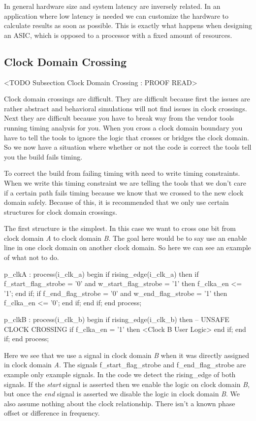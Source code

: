 In general hardware size and system latency are inversely related. In an application where low latency is needed we can customize the hardware to calculate results as soon as possible. This is exactly what happens when designing an \ac{ASIC}, which is opposed to a processor with a fixed amount of resources. 

\subsection{Clock Domain Crossing}
	<TODO Subsection Clock Domain Crossing : PROOF READ>
	
Clock domain crossings are difficult. They are difficult because first the issues are rather abstract and behavioral simulations will not find issues in clock crossings. Next they are difficult because you have to break way from the vendor tools running timing analysis for you. When you cross a clock domain boundary you have to tell the tools to ignore the logic that crosses or bridges the clock domain. So we now have a situation where whether or not the code is correct the tools tell you the build fails timing. 

To correct the build from failing timing with need to write timing constraints. When we write this timing constraint we are telling the tools that we don't care if a certain path fails timing because we know that we crossed to the new clock domain safely. Because of this, it is recommended that we only use certain structures for clock domain crossings. 
	
The first structure is the simplest. In this case we want to cross one bit from clock domain \emph{A} to clock domain \emph{B}. The goal here would be to say use an enable line in one clock domain on another clock domain. So here we can see an example of what not to do. 

\begin{VHDLlisting}[tabsize=4]
p_clkA : process(i_clk_a)
begin
	if rising_edge(i_clk_a) then
		if f_start_flag_strobe = '0' and w_start_flag_strobe = '1' then
			f_clka_en <= '1';
		end if;
		if f_end_flag_strobe = '0' and w_end_flag_strobe = '1' then
			f_clka_en <= '0';
		end if;
	end if;
end process;

p_clkB : process(i_clk_b)
begin
	if rising_edge(i_clk_b) then
		-- UNSAFE CLOCK CROSSING
		if f_clka_en = '1' then
			<Clock B User Logic>
		end if;
	end if;
end process;
\end{VHDLlisting}	
	
Here we see that we use a signal in clock domain \emph{B} when it was directly assigned in clock domain \emph{A}. The signals f\_start\_flag\_strobe and f\_end\_flag\_strobe are example only example signals. In the code we detect the rising\_edge of both signals. If the \emph{start} signal is asserted then we enable the logic on clock domain \emph{B}, but once the \emph{end} signal is asserted we disable the logic in clock domain \emph{B}. We also assume nothing about the clock relationship. There isn't a known phase offset or difference in frequency. 

